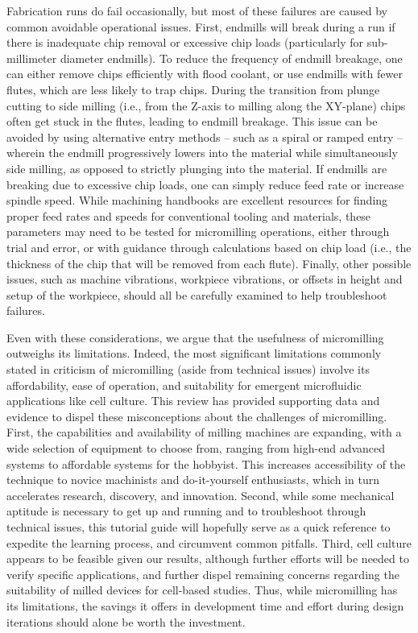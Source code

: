 {Fabrication runs do fail occasionally, but most of these failures are caused by common avoidable operational issues. First, endmills will break during a run if there is inadequate chip removal or excessive chip loads (particularly for sub-millimeter diameter endmills). To reduce the frequency of endmill breakage, one can either remove chips efficiently with flood coolant, or use endmills with fewer flutes, which are less likely to trap chips. During the transition from plunge cutting to side milling (i.e., from the Z-axis to milling along the XY-plane) chips often get stuck in the flutes, leading to endmill breakage. This issue can be avoided by using alternative entry methods – such as a spiral or ramped entry – wherein the endmill progressively lowers into the material while simultaneously side milling, as opposed to strictly plunging into the material. If endmills are breaking due to excessive chip loads, one can simply reduce feed rate or increase spindle speed. While machining handbooks are excellent resources for finding proper feed rates and speeds for conventional tooling and materials, these parameters may need to be tested for micromilling operations, either through trial and error, or with guidance through calculations based on chip load (i.e., the thickness of the chip that will be removed from each flute). Finally, other possible issues, such as machine vibrations, workpiece vibrations, or offsets in height and setup of the workpiece, should all be carefully examined to help troubleshoot failures. 	

Even with these considerations, we argue that the usefulness of micromilling outweighs its limitations. Indeed, the most significant limitations commonly stated in criticism of micromilling (aside from technical issues) involve its affordability, ease of operation, and suitability for emergent microfluidic applications like cell culture. This review has provided supporting data and evidence to dispel these misconceptions about the challenges of micromilling. First, the capabilities and availability of milling machines are expanding, with a wide selection of equipment to choose from, ranging from high-end advanced systems to affordable systems for the hobbyist. This increases accessibility of the technique to novice machinists and do-it-yourself enthusiasts, which in turn accelerates research, discovery, and innovation. Second, while some mechanical aptitude is necessary to get up and running and to troubleshoot through technical issues, this tutorial guide will hopefully serve as a quick reference to expedite the learning process, and circumvent common pitfalls. Third, cell culture appears to be feasible given our results, although further efforts will be needed to verify specific applications, and further dispel remaining concerns regarding the suitability of milled devices for cell-based studies. Thus, while micromilling has its limitations, the savings it offers in development time and effort during design iterations should alone be worth the investment.

}
